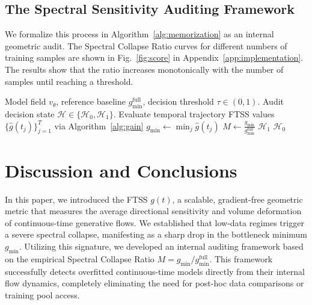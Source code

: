 \documentclass[11pt]{article}
\begin{document}
\subsection{The Spectral Sensitivity Auditing Framework}
\label{sec:diagnostic}
We formalize this process in Algorithm~\ref{alg:memorization} as an internal geometric audit. The Spectral Collapse Ratio curves for different numbers of training samples are shown in Fig.~\ref{fig:score} in Appendix~\ref{app:implementation}. The results show that the ratio increases monotonically with the number of samples until reaching a threshold.

\begin{algorithm}[htbp]
\caption{Geometric Memorization Audit via Spectral Sensitivity}
\label{alg:memorization}
\begin{algorithmic}[1]
\Require Model field $v_\theta$, reference baseline $g_{\min}^{\text{full}}$, decision threshold $\tau \in (0,1)$.
\Ensure Audit decision state $\mathcal{H} \in \{\mathcal{H}_0, \mathcal{H}_1\}$.
\State Evaluate temporal trajectory FTSS values $\{\hat{g}(t_j)\}_{j=1}^T$ via Algorithm~\ref{alg:gain}
\State $g_{\min} \gets \min_j \hat{g}(t_j)$
\State $M \gets \frac{g_{\min}}{g_{\min}^{\text{full}}}$
    \State \Return $\mathcal{H}_1$ 
\Else
    \State \Return $\mathcal{H}_0$ 
\EndIf
\end{algorithmic}
\end{algorithm}

\section{Discussion and Conclusions}
\label{sec:discussion_conclusion}
In this paper, we introduced the FTSS $g(t)$, a scalable, gradient-free geometric metric that measures the average directional sensitivity and volume deformation of continuous-time generative flows. We established that low-data regimes trigger a severe spectral collapse, manifesting as a sharp drop in the bottleneck minimum $g_{\min}$. Utilizing this signature, we developed an internal auditing framework based on the empirical Spectral Collapse Ratio $M = g_{\min} / g_{\min}^{\text{full}}$. This framework successfully detects overfitted continuous-time models directly from their internal flow dynamics, completely eliminating the need for post-hoc data comparisons or training pool access.
\end{document}

